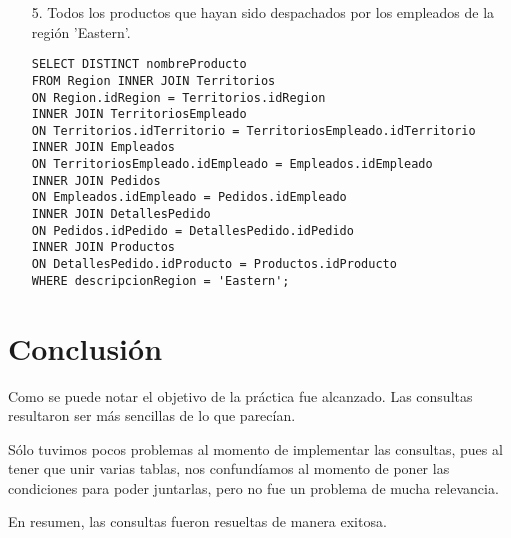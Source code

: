 \documentclass[12pt, letterpaper]{article}
\begin{document}
\begin{itemize}
        \item[5.] Todos los productos que hayan sido despachados por los empleados
                  de la región 'Eastern'.

                  \begin{lstlisting}
SELECT DISTINCT nombreProducto
FROM Region INNER JOIN Territorios
ON Region.idRegion = Territorios.idRegion
INNER JOIN TerritoriosEmpleado
ON Territorios.idTerritorio = TerritoriosEmpleado.idTerritorio
INNER JOIN Empleados 
ON TerritoriosEmpleado.idEmpleado = Empleados.idEmpleado
INNER JOIN Pedidos
ON Empleados.idEmpleado = Pedidos.idEmpleado
INNER JOIN DetallesPedido 
ON Pedidos.idPedido = DetallesPedido.idPedido
INNER JOIN Productos
ON DetallesPedido.idProducto = Productos.idProducto
WHERE descripcionRegion = 'Eastern';
                  \end{lstlisting}

    \end{itemize}

    \section*{Conclusión}
    Como se puede notar el objetivo de la práctica fue alcanzado. Las consultas resultaron ser más
    sencillas de lo que parecían.\vspace{.3cm}

    Sólo tuvimos pocos problemas al momento de implementar las consultas, pues al tener que unir
    varias tablas, nos confundíamos al momento de poner las condiciones para poder juntarlas, pero 
    no fue un problema de mucha relevancia.\vspace{.3cm}

    En resumen, las consultas fueron resueltas de manera exitosa.
\end{document}

